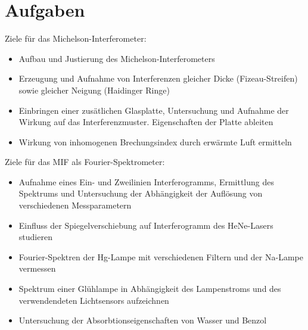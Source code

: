\section{Aufgaben} %
\label{sec:aufgaben}

Ziele für das Michelson-Interferometer:

	\begin{itemize}
		\item Aufbau und Justierung des Michelson-Interferometers

		\item Erzeugung und Aufnahme von Interferenzen gleicher Dicke (Fizeau-Streifen) sowie gleicher Neigung (Haidinger Ringe)

		\item Einbringen einer zusätlichen Glasplatte, Untersuchung und Aufnahme der Wirkung auf das Interferenzmuster.
		Eigenschaften der Platte ableiten

		\item Wirkung von inhomogenen Brechungsindex durch erwärmte Luft ermitteln
	\end{itemize}

	Ziele für das MIF als Fourier-Spektrometer:

	\begin{itemize}
		\item Aufnahme eines Ein- und Zweilinien Interferogramms, Ermittlung des Spektrums und Untersuchung der Abhängigkeit der Auflösung von verschiedenen Messparametern

		\item Einfluss der Spiegelverschiebung auf Interferogramm des HeNe-Lasers studieren

		\item Fourier-Spektren der Hg-Lampe mit verschiedenen Filtern und der Na-Lampe vermessen

		\item Spektrum einer Glühlampe in Abhängigkeit des Lampenstroms und des verwendendeten Lichtsensors aufzeichnen

		\item Untersuchung der Absorbtionseigenschaften von Wasser und Benzol
		
	\end{itemize}

